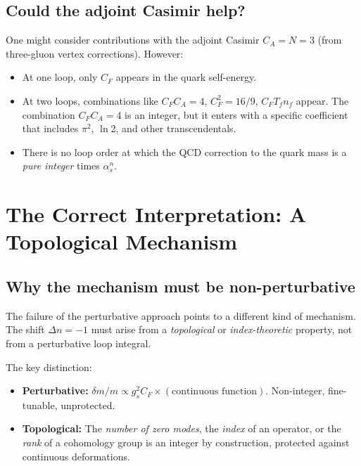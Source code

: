 \documentclass[11pt,a4paper]{article}
\theoremstyle{definition}
\theoremstyle{remark}
\begin{document}
\subsection{Could the adjoint Casimir help?}

One might consider contributions with the adjoint Casimir
$C_A = N = 3$ (from three-gluon vertex corrections).  However:
\begin{itemize}
\item At one loop, only $C_F$ appears in the quark self-energy.
\item At two loops, combinations like $C_F C_A = 4$,
$C_F^2 = 16/9$, $C_F T_f n_f$ appear.  The combination $C_F C_A = 4$
is an integer, but it enters with a specific coefficient that includes
$\pi^2$, $\ln 2$, and other transcendentals.
\item There is no loop order at which the QCD correction to the quark
mass is a \emph{pure integer} times $\alpha_s^n$.
\end{itemize}

\section{The Correct Interpretation: A Topological Mechanism}
\label{sec:topological}

\subsection{Why the mechanism must be non-perturbative}

The failure of the perturbative approach points to a different kind
of mechanism.  The shift $\Delta n = -1$ must arise from a
\emph{topological} or \emph{index-theoretic} property, not from
a perturbative loop integral.

The key distinction:
\begin{itemize}
\item \textbf{Perturbative:} $\delta m/m \propto g_s^2 C_F \times
(\text{continuous function})$.  Non-integer, fine-tunable, unprotected.
\item \textbf{Topological:} The \emph{number of zero modes}, the
\emph{index} of an operator, or the \emph{rank} of a cohomology group
is an integer by construction, protected against continuous deformations.
\end{itemize}
\end{document}
